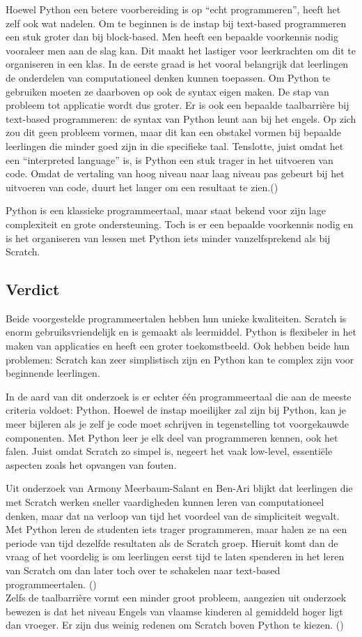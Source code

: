 Hoewel Python een betere voorbereiding is op “echt programmeren”, heeft het zelf ook wat nadelen. Om te beginnen is de instap bij text-based programmeren een stuk groter dan bij block-based. Men heeft een bepaalde voorkennis nodig vooraleer men aan de slag kan. Dit maakt het lastiger voor leerkrachten om dit te organiseren in een klas.
In de eerste graad is het vooral belangrijk dat leerlingen de onderdelen van computationeel denken kunnen toepassen. Om Python te gebruiken moeten ze daarboven op ook de syntax eigen maken. De stap van probleem tot applicatie wordt dus groter. 
Er is ook een bepaalde taalbarrière bij text-based programmeren: de syntax van Python leunt aan bij het engels. Op zich zou dit geen probleem vormen, maar dit kan een obstakel vormen bij bepaalde leerlingen die minder goed zijn in die specifieke taal.
Tenslotte, juist omdat het een “interpreted language” is,  is Python een stuk trager in het uitvoeren van code. Omdat de vertaling van hoog niveau naar laag niveau pas gebeurt bij het uitvoeren van code, duurt het langer om een resultaat te zien.(\cite{Armoni2015})

Python is een klassieke programmeertaal, maar staat bekend voor zijn lage complexiteit en grote ondersteuning. Toch is er een bepaalde voorkennis nodig en is het organiseren van lessen met Python iets minder vanzelfsprekend als bij Scratch.

\subsection{Verdict}

Beide voorgestelde programmeertalen hebben hun unieke kwaliteiten. Scratch is enorm gebruiksvriendelijk en is gemaakt als leermiddel. Python is flexibeler in het maken van applicaties en heeft een groter toekomstbeeld. Ook hebben beide hun problemen: Scratch kan zeer simplistisch zijn en Python kan te complex zijn voor beginnende leerlingen. 

In de aard van dit onderzoek is er echter één programmeertaal die aan de meeste criteria voldoet: Python. Hoewel de instap moeilijker zal zijn bij Python, kan je meer bijleren als je zelf je code moet schrijven in tegenstelling tot voorgekauwde componenten. Met Python leer je elk deel van programmeren kennen, ook het falen. Juist omdat Scratch zo simpel is, negeert het vaak low-level, essentiële aspecten zoals het opvangen van fouten. 

Uit onderzoek van Armony Meerbaum-Salant en Ben-Ari blijkt dat leerlingen die met Scratch werken sneller vaardigheden kunnen leren van computationeel denken, maar dat na verloop van tijd het voordeel van de simpliciteit wegvalt. Met Python leren de studenten iets trager programmeren, maar halen ze na een periode van tijd dezelfde resultaten als de Scratch groep. Hieruit komt dan de vraag of het voordelig is om leerlingen eerst tijd te laten spenderen in het leren van Scratch om dan later toch over te schakelen naar text-based programmeertalen. (\cite{Armoni2015,Fagan2017})\\

Zelfs de taalbarrière vormt een minder groot probleem, aangezien uit onderzoek bewezen is dat het niveau Engels van vlaamse kinderen al gemiddeld hoger ligt dan vroeger. Er zijn dus weinig redenen om Scratch boven Python te kiezen. (\cite{Denies2015})





